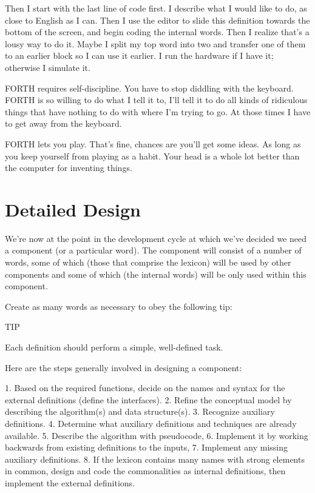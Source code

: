 Then I start with the last line of code first. I describe what I would like
to do, as close to English as I can. Then I use the editor to slide this
definition towards the bottom of the screen, and begin coding the internal
words. Then I realize that's a lousy way to do it. Maybe I split my top word
into two and transfer one of them to an earlier block so I can use it earlier.
I run the hardware if I have it; otherwise I simulate it.

FORTH requires self-discipline. You have to stop diddling with the
keyboard. FORTH is so willing to do what I tell it to, I'll tell it to do all
kinds of ridiculous things that have nothing to do with where I'm trying to
go. At those times I have to get away from the keyboard.

FORTH lets you play. That's fine, chances are you'll get some ideas. As
long as you keep yourself from playing as a habit. Your head is a whole lot
better than the computer for inventing things.

\section{Detailed Design}

We're now at the point in the development cycle at which we've decided
we need a component (or a particular word). The component will consist
of a number of words, some of which (those that comprise the lexicon) will
be used by other components and some of which (the internal words) will
be only used within this component.

Create as many words as necessary to obey the following tip:

TIP

Each definition should perform a simple, well-defined task.

Here are the steps generally involved in designing a component:

1. Based on the required functions, decide on the names and syntax for the
   external definitions (define the interfaces).
2. Refine the conceptual model by describing the algorithm(s) and data
   structure(s).
3. Recognize auxiliary definitions.
4. Determine what auxiliary definitions and techniques are already available.
5. Describe the algorithm with pseudocode,
6. Implement it by working backwards from existing definitions to the inputs,
7. Implement any missing auxiliary definitions.
8. If the lexicon contains many names with strong elements in common,
   design and code the commonalities as internal definitions, then implement
   the external definitions.

